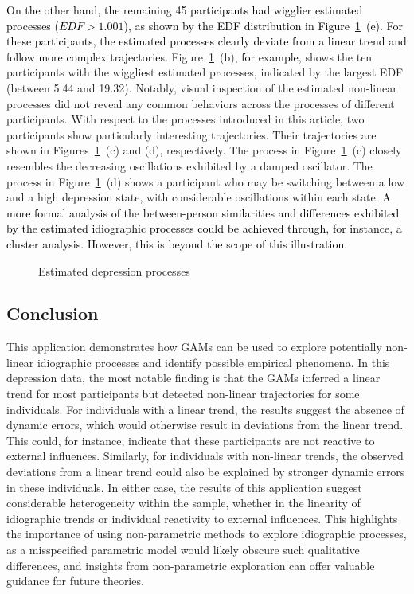 \documentclass[man, floatsintext]{apa7}
\begin{document}
\textcolor{black}{ On the other hand, the remaining 45 participants had
  wigglier
  estimated processes ($EDF > 1.001$), as shown by the EDF distribution in
  Figure~\ref{fig:dem_smooth}~(e). For these participants, the estimated
  processes clearly deviate from a linear trend and follow more complex
  trajectories. } Figure~\ref{fig:dem_smooth}~(b), \textcolor{black}{for
  example,} shows the ten participants with the wiggliest estimated processes,
indicated by the largest EDF (between 5.44 and 19.32). Notably, visual
inspection of the estimated non-linear processes did not reveal any common
behaviors across the processes of different participants. With respect to the
processes introduced in this article, two participants show particularly
interesting trajectories. Their trajectories are shown in
Figures~\ref{fig:dem_smooth}~(c) and (d), respectively. The process in
Figure~\ref{fig:dem_smooth}~(c) closely resembles the decreasing oscillations
exhibited by a damped oscillator. The process in
Figure~\ref{fig:dem_smooth}~(d) shows a participant who may be switching
between a low and a high depression state, with considerable oscillations
within each state. \textcolor{black}{A more formal analysis of the
  between-person similarities and differences exhibited by the estimated
  idiographic processes could be achieved through, for instance, a cluster
  analysis. However, this is beyond the scope of this illustration. }

\begin{figure}[!t]
  \caption{Estimated depression processes}
  \label{fig:dem_smooth}
\end{figure}

\subsection{Conclusion}

This application demonstrates how GAMs can be used to explore potentially
non-linear idiographic processes and identify possible empirical phenomena. In
this depression data, the most notable finding is that the GAMs inferred a
linear trend for most participants but detected non-linear trajectories for
some individuals. For individuals with a linear trend, the results suggest the
absence of dynamic errors, which would otherwise result in deviations from the
linear trend. This could, for instance, indicate that these participants are
not reactive to external influences. Similarly, for individuals with non-linear
trends, the observed deviations from a linear trend could also be explained by
stronger dynamic errors in these individuals. In either case, the results of
this application suggest considerable heterogeneity within the sample, whether
in the linearity of idiographic trends or individual reactivity to external
influences. This highlights the importance of using non-parametric methods to
explore idiographic processes, as a misspecified parametric model would likely
obscure such qualitative differences, and insights from non-parametric
exploration can offer valuable guidance for future theories.
\end{document}
